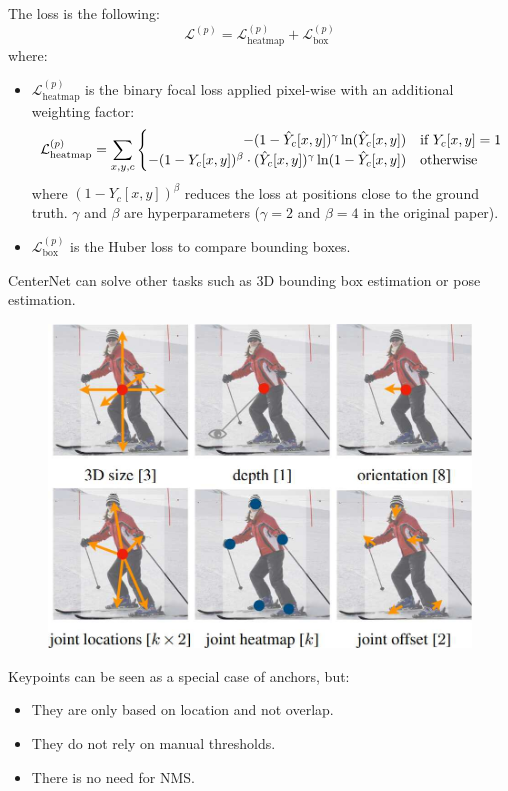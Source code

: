 \begin{description}
\begin{description}
                The loss is the following:
                \[ \mathcal{L}^{(p)} = \mathcal{L}_\text{heatmap}^{(p)} + \mathcal{L}_\text{box}^{(p)} \]
                where:
                \begin{itemize}
                    \item $\mathcal{L}_\text{heatmap}^{(p)}$ is the binary focal loss applied pixel-wise with an additional weighting factor:
                    \[ \mathcal{L}_\text{heatmap}^{(p)} = \sum_{x, y, c} \begin{cases}
                        \hfill -(1-\hat{Y}_c[x, y])^\gamma \ln(\hat{Y}_c[x, y]) & \text{if $Y_c[x, y] = 1$} \\
                        -(1-Y_c[x, y])^\beta \cdot (\hat{Y}_c[x, y])^\gamma \ln(1-\hat{Y}_c[x, y]) & \text{otherwise} \\
                    \end{cases} \]
                    where $(1-Y_c[x, y])^\beta$ reduces the loss at positions close to the ground truth. $\gamma$ and $\beta$ are hyperparameters ($\gamma=2$ and $\beta=4$ in the original paper).
                    \item $\mathcal{L}_\text{box}^{(p)}$ is the Huber loss to compare bounding boxes.
                \end{itemize}
        \end{description}

    \begin{remark}
        CenterNet can solve other tasks such as 3D bounding box estimation or pose estimation.

        \begin{figure}[H]
            \centering
            \includegraphics[width=0.55\linewidth]{./img/_centernet_other_tasks.jpg}
        \end{figure}
    \end{remark}

    \begin{remark}
        Keypoints can be seen as a special case of anchors, but:
        \begin{itemize}
            \item They are only based on location and not overlap.
            \item They do not rely on manual thresholds.
            \item There is no need for NMS.
        \end{itemize}


\end{remark}
\end{description}
